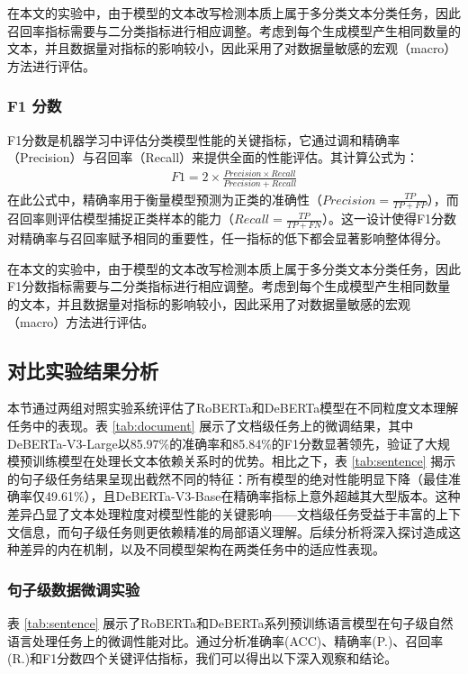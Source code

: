 在本文的实验中，由于模型的文本改写检测本质上属于多分类文本分类任务，因此召回率指标需要与二分类指标进行相应调整。考虑到每个生成模型产生相同数量的文本，并且数据量对指标的影响较小，因此采用了对数据量敏感的宏观（macro）方法进行评估。

\subsubsection{F1 分数}

F1分数是机器学习中评估分类模型性能的关键指标，它通过调和精确率（Precision）与召回率（Recall）来提供全面的性能评估。其计算公式为：
\begin{align}
    F1 = 2 \times \frac{Precision \times Recall}{Precision + Recall}
\end{align}
在此公式中，精确率用于衡量模型预测为正类的准确性（\(Precision = \frac{TP}{TP + FP}\)），而召回率则评估模型捕捉正类样本的能力（\(Recall = \frac{TP}{TP + FN}\)）。这一设计使得F1分数对精确率与召回率赋予相同的重要性，任一指标的低下都会显著影响整体得分。

在本文的实验中，由于模型的文本改写检测本质上属于多分类文本分类任务，因此F1分数指标需要与二分类指标进行相应调整。考虑到每个生成模型产生相同数量的文本，并且数据量对指标的影响较小，因此采用了对数据量敏感的宏观（macro）方法进行评估。

\subsection{对比实验结果分析}
\label{sec:method-experiment-main}

本节通过两组对照实验系统评估了RoBERTa和DeBERTa模型在不同粒度文本理解任务中的表现。表 \ref{tab:document} 展示了文档级任务上的微调结果，其中DeBERTa-V3-Large以85.97\%的准确率和85.84\%的F1分数显著领先，验证了大规模预训练模型在处理长文本依赖关系时的优势。相比之下，表 \ref{tab:sentence} 揭示的句子级任务结果呈现出截然不同的特征：所有模型的绝对性能明显下降（最佳准确率仅49.61\%），且DeBERTa-V3-Base在精确率指标上意外超越其大型版本。这种差异凸显了文本处理粒度对模型性能的关键影响——文档级任务受益于丰富的上下文信息，而句子级任务则更依赖精准的局部语义理解。后续分析将深入探讨造成这种差异的内在机制，以及不同模型架构在两类任务中的适应性表现。

\subsubsection{句子级数据微调实验}

表 \ref{tab:sentence} 展示了RoBERTa和DeBERTa系列预训练语言模型在句子级自然语言处理任务上的微调性能对比。通过分析准确率(ACC)、精确率(P.)、召回率(R.)和F1分数四个关键评估指标，我们可以得出以下深入观察和结论。

